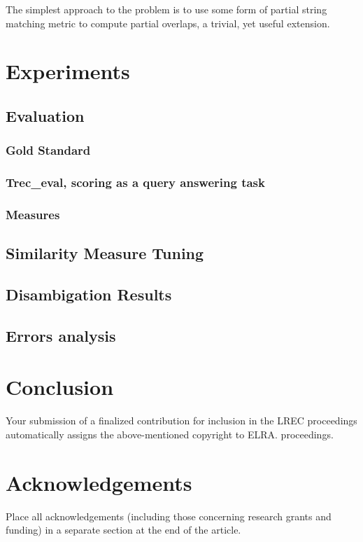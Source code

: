 \documentclass[10pt, a4paper]{article}
\begin{document}
The simplest approach to the problem is to use some form of partial string matching metric to compute partial overlaps, a trivial, yet useful extension. 

\section{Experiments}
\subsection{Evaluation}
\subsubsection{Gold Standard}
\subsubsection{Trec\_eval, scoring as a query answering task}
\subsubsection{Measures}
\subsection{Similarity Measure Tuning}
\subsection{Disambigation Results}
\subsection{Errors analysis}

\section{Conclusion}

Your submission of a finalized contribution for inclusion in the LREC proceedings automatically assigns the above-mentioned copyright to ELRA.
proceedings.

\section{Acknowledgements}

Place all acknowledgements (including those concerning research grants and funding) in a separate section at the end of the article.




\end{document}
